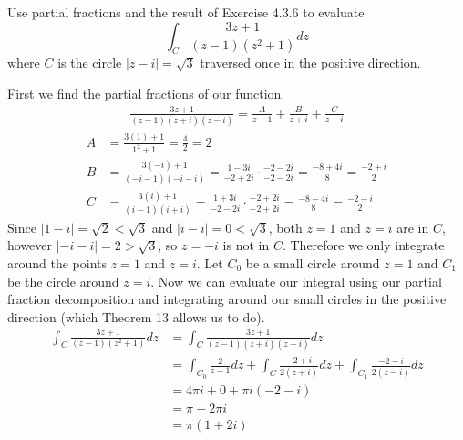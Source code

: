 \documentclass[12pt]{article}
\newenvironment{problem}[2][Problem]{\begin{trivlist}
\item[\hskip \labelsep {\bfseries #1} \hskip \labelsep {\bfseries #2.}]}{\end{trivlist}}
\begin{document}
\begin{problem}{3}
	Use partial fractions and the result of Exercise 4.3.6 to evaluate
	\[
		\int_{C} \frac{3z + 1}{(z - 1)(z^2 + 1)}dz
	\]
	where $C$ is the circle $|z-i| = \sqrt{3}$ traversed once in the positive direction.
\end{problem}
First we find the partial fractions of our function.
\begin{align*}
	\frac{3z + 1}{(z-1)(z+i)(z-i)} = \frac{A}{z-1} + \frac{B}{z+i} + \frac{C}{z-i}
\end{align*}
\begin{align*}
	A &= \frac{3(1) + 1}{1^2 + 1} = \frac{4}{2} = 2 \\
	B &= \frac{3(-i) + 1}{(-i-1)(-i-i)} = \frac{1 - 3i}{-2 + 2i} \cdot \frac{-2 - 2i}{-2 - 2i} = \frac{-8 + 4i}{8} = \frac{-2 + i}{2} \\
	C &= \frac{3(i) + 1}{(i-1)(i+i)} = \frac{1 + 3i}{-2 - 2i} \cdot \frac{-2 + 2i}{-2 + 2i} = \frac{-8 - 4i}{8} = \frac{-2 -i}{2}
\end{align*}
Since $|1 - i| = \sqrt{2} < \sqrt{3}$ and $|i - i| = 0 < \sqrt{3}$, both $z = 1$ and $z = i$ are in $C$, however $|-i - i| = 2 > \sqrt{3}$, so $z = -i$ is not in $C$. Therefore we only integrate around the points $z = 1$ and $z = i$. Let $C_0$ be a small circle around $z = 1$ and $C_1$ be the circle around $z = i$. Now we can evaluate our integral using our partial fraction decomposition and integrating around our small circles in the positive direction (which Theorem 13 allows us to do). 
\begin{align*}
	\int_{C} \frac{3z + 1}{(z - 1)(z^2 + 1)}dz &= \int_{C} \frac{3z + 1}{(z - 1)(z + i)(z - i)}dz \\
						   &= \int_{C_0} \frac{2}{z - 1}dz + \int_{C} \frac{-2 + i}{2(z + i)}dz + \int_{C_1} \frac{-2 -i}{2(z-i)}dz \\
						   &= 4\pi i + 0 + \pi i(-2 - i) \\
						   &= \pi + 2\pi i \\ 
						   &= \pi(1 + 2i)
\end{align*}
\end{document}
